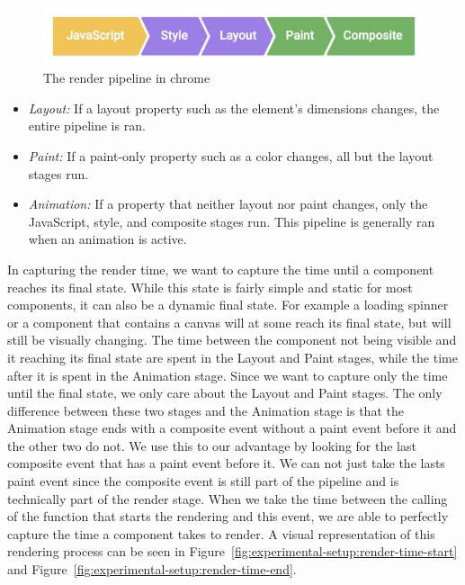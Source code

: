 \begin{figure}[h]
	\includegraphics[width=\columnwidth]{figures/experimental-setup/render-pipeline.jpg}
	\caption{The render pipeline in chrome}
	\label{fig:experimental-setup:pipeline}
	\centering
\end{figure}

\begin{itemize}
	\item \emph{Layout:} If a layout property such as the element's dimensions changes, the entire pipeline is ran.
	\item \emph{Paint:} If a paint-only property such as a color changes, all but the layout stages run.
	\item \emph{Animation:} If a property that neither layout nor paint changes, only the JavaScript, style, and composite stages run. This pipeline is generally ran when an animation is active.
\end{itemize}

In capturing the render time, we want to capture the time until a component reaches its final state. While this state is fairly simple and static for most components, it can also be a dynamic final state. For example a loading spinner or a component that contains a canvas will at some reach its final state, but will still be visually changing. The time between the component not being visible and it reaching its final state are spent in the Layout and Paint stages, while the time after it is spent in the Animation stage. Since we want to capture only the time until the final state, we only care about the Layout and Paint stages. The only difference between these two stages and the Animation stage is that the Animation stage ends with a composite event without a paint event before it and the other two do not. We use this to our advantage by looking for the last composite event that has a paint event before it. We can not just take the lasts paint event since the composite event is still part of the pipeline and is technically part of the render stage. When we take the time between the calling of the function that starts the rendering and this event, we are able to perfectly capture the time a component takes to render. A visual representation of this rendering process can be seen in Figure~\ref{fig:experimental-setup:render-time-start} and Figure~\ref{fig:experimental-setup:render-time-end}.

